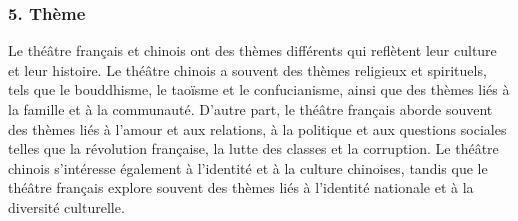 \documentclass[UTF8,a4paper,12pt]{ctexart}
\numberwithin{equation}{section}
\begin{document}
\subsubsection*{5. Thème}
Le théâtre français et chinois ont des thèmes différents qui reflètent leur culture et leur histoire. Le théâtre chinois a souvent des thèmes religieux et spirituels, tels que le bouddhisme, le taoïsme et le confucianisme, ainsi que des thèmes liés à la famille et à la communauté. D'autre part, le théâtre français aborde souvent des thèmes liés à l'amour et aux relations, à la politique et aux questions sociales telles que la révolution française, la lutte des classes et la corruption. Le théâtre chinois s'intéresse également à l'identité et à la culture chinoises, tandis que le théâtre français explore souvent des thèmes liés à l'identité nationale et à la diversité culturelle. 

%
%
%
%
%
%
%
\end{document}
